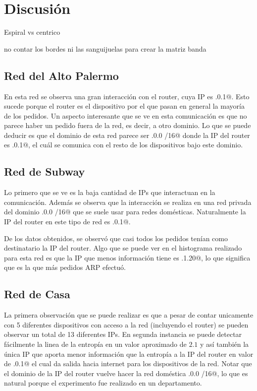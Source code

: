 \section{Discusi\'on}

Espiral vs centrico

no contar los bordes ni las sanguijuelas para crear la matriz banda



\subsection{Red del Alto Palermo}

En esta red se observa una gran interacci\'on con el router, cuya IP es .0.1@. Esto 
sucede porque el router es el dispositivo por el que pasan en general la mayor\'ia de los pedidos.
Un aspecto interesante que se ve en esta comunicaci\'on es que no parece haber un pedido fuera de
la red, es decir, a otro dominio. Lo que se puede deducir es que el dominio de esta red parece ser 
.0.0 /16@ donde la IP del router es .0.1@, el cu\'al se comunica con el
resto de los dispositivos bajo este dominio.

\subsection{Red de Subway}

Lo primero que se ve es la baja cantidad de IPs que interactuan en la comunicaci\'on. Adem\'as se
observa que la interacci\'on se realiza en una red privada del dominio .0.0 /16@ que 
se suele usar para redes dom\'esticas. Naturalmente la IP del router en este tipo de red es 
.0.1@.

De los datos obtenidos, se observ\'o que casi todos los pedidos ten\'ian como destinatario la IP
del router. Algo que se puede ver en el histograma realizado para esta red es que la IP que menos
informaci\'on tiene es .1.20@, lo que significa que es la que m\'as pedidos ARP 
efectu\'o.

\subsection{Red de Casa}

La primera observaci\'on que se puede realizar es que a pesar de contar unicamente con 5 diferentes 
dispositivos con acceso a la red (incluyendo el router) se pueden observar un total de 13 diferentes 
IPs. En segunda instancia se puede detectar f\'acilmente la linea de la entrop\'ia en un valor 
aproximado de $2.1$ y as\'i tambi\'en la \'unica IP que aporta menor informaci\'on que la entrop\'ia 
a la IP del router en valor de .0.1@ el cual da salida hacia internet para los 
dispositivos de la red. Notar que el dominio de la IP del router vuelve hacer la red dom\'estica .0.0 /16@, lo que es natural porque el experimento fue realizado en un departamento.


